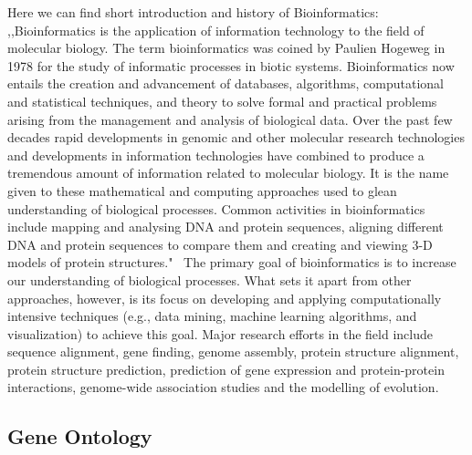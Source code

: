 Here we can find short introduction and history of Bioinformatics: ,,Bioinformatics is the application of information technology to the field of molecular biology. The term bioinformatics was coined by Paulien Hogeweg in 1978 for the study of informatic processes in biotic systems. Bioinformatics now entails the creation and advancement of databases, algorithms, computational and statistical techniques, and theory to solve formal and practical problems arising from the management and analysis of biological data. Over the past few decades rapid developments in genomic and other molecular research technologies and developments in information technologies have combined to produce a tremendous amount of information related to molecular biology. It is the name given to these mathematical and computing approaches used to glean understanding of biological processes. Common activities in bioinformatics include mapping and analysing DNA and protein sequences, aligning different DNA and protein sequences to compare them and creating and viewing 3-D models of protein structures."~\cite{Bioinformatic}
The primary goal of bioinformatics is to increase our understanding of biological processes. What sets it apart from other approaches, however, is its focus on developing and applying computationally intensive techniques (e.g., data mining, machine learning algorithms, and visualization) to achieve this goal. Major research efforts in the field include sequence alignment, gene finding, genome assembly, protein structure alignment, protein structure prediction, prediction of gene expression and protein-protein interactions, genome-wide association studies and the modelling of evolution.

\subsection{Gene Ontology}
\label{sec:gene_ontology}

